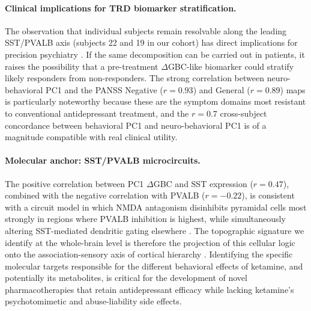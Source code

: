 \documentclass[11pt]{article}
\begin{document}
\paragraph{Clinical implications for TRD biomarker stratification.} The
observation that individual subjects remain resolvable along the leading
SST/PVALB axis (subjects 22 and 19 in our cohort) has direct implications
for precision psychiatry \citep{insel2014rdoc,drysdale2017resting}. If the
same decomposition can be carried out in patients, it raises the possibility
that a pre-treatment $\Delta$GBC-like biomarker could stratify likely
responders from non-responders. The strong correlation between
neuro-behavioral PC1 and the PANSS Negative ($r=0.93$) and General
($r=0.89$) maps is particularly noteworthy because these are the symptom
domains most resistant to conventional antidepressant treatment, and the
$r=0.7$ cross-subject concordance between behavioral PC1 and neuro-behavioral
PC1 is of a magnitude compatible with real clinical utility.

\paragraph{Molecular anchor: SST/PVALB microcircuits.} The positive
correlation between PC1 $\Delta$GBC and SST expression ($r=0.47$), combined
with the negative correlation with PVALB ($r=-0.22$), is consistent with a
circuit model in which NMDA antagonism disinhibits pyramidal cells most
strongly in regions where PVALB inhibition is highest, while simultaneously
altering SST-mediated dendritic gating elsewhere
\citep{moghaddam1997activation,homayoun2007nmda}. The topographic signature
we identify at the whole-brain level is therefore the projection of this
cellular logic onto the association-sensory axis of cortical hierarchy
\citep{margulies2016situating,burt2018hierarchy}. Identifying the specific
molecular targets responsible for the different behavioral effects of
ketamine, and potentially its metabolites, is critical for the development
of novel pharmacotherapies that retain antidepressant efficacy while lacking
ketamine's psychotomimetic and abuse-liability side effects.
\end{document}
